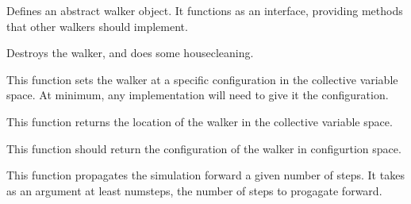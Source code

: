 \documentclass[letterpaper,10pt,english]{sphinxmanual}
\begin{document}
\begin{fulllineitems}
\label{src/src.doc:walker.walker}
Defines an abstract walker object.  It functions as an interface, providing methods that other
walkers should implement.

\begin{fulllineitems}
\label{src/src.doc:walker.walker.close}
Destroys the walker, and does some housecleaning.

\end{fulllineitems}


\begin{fulllineitems}
\label{src/src.doc:walker.walker.equilibrate}
This function sets the walker at a specific configuration in the collective variable space.
At minimum, any implementation will need to give it the configuration.

\end{fulllineitems}


\begin{fulllineitems}
\label{src/src.doc:walker.walker.getColvars}
This function returns the location of the walker in the collective variable space.

\end{fulllineitems}


\begin{fulllineitems}
\label{src/src.doc:walker.walker.getConfig}
This function should return the configuration of the walker in configurtion space.

\end{fulllineitems}


\begin{fulllineitems}
\label{src/src.doc:walker.walker.propagate}
This function propagates the simulation forward a given number of steps.
It takes as an argument at least numsteps, the number of steps to progagate forward.


\end{fulllineitems}
\end{fulllineitems}
\end{document}
